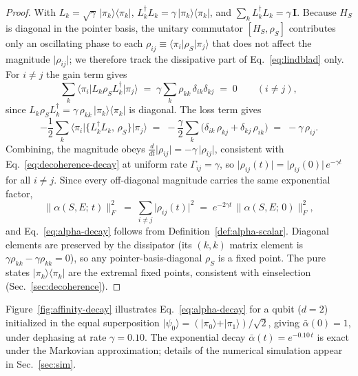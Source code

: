 \begin{proof}
With $L_k = \sqrt{\gamma}\,\vert\pi_k\rangle\langle\pi_k\vert$,
$L_k^\dagger L_k = \gamma\,\vert\pi_k\rangle\langle\pi_k\vert$, and
$\sum_k L_k^\dagger L_k = \gamma\,\mathbf{I}$.
Because $H_S$ is diagonal in the pointer basis, the unitary commutator
$[H_S,\rho_S]$ contributes only an oscillating phase to each
$\rho_{ij}\equiv\langle\pi_i\vert\rho_S\vert\pi_j\rangle$ that does not
affect the magnitude $\lvert\rho_{ij}\rvert$; we therefore track the
dissipative part of Eq.~\eqref{eq:lindblad} only.
For $i\neq j$ the gain term gives
\begin{equation*}
  \sum_k\langle\pi_i\vert L_k\rho_S L_k^\dagger\vert\pi_j\rangle
  \;=\;
  \gamma\sum_k \rho_{kk}\,\delta_{ik}\delta_{kj}
  \;=\; 0
  \qquad (i \neq j),
\end{equation*}
since $L_k\rho_S L_k^\dagger = \gamma\,\rho_{kk}\,\vert\pi_k\rangle\langle\pi_k\vert$
is diagonal.
The loss term gives
\begin{equation*}
  -\frac{1}{2}\sum_k\!
  \langle\pi_i\vert\{L_k^\dagger L_k,\,\rho_S\}\vert\pi_j\rangle
  \;=\;
  -\frac{\gamma}{2}\sum_k\!\bigl(\delta_{ik}\,\rho_{kj}
    + \delta_{kj}\,\rho_{ik}\bigr)
  \;=\; -\gamma\,\rho_{ij}.
\end{equation*}
Combining, the magnitude obeys
$\frac{d}{dt}\lvert\rho_{ij}\rvert = -\gamma\,\lvert\rho_{ij}\rvert$,
consistent with Eq.~\eqref{eq:decoherence-decay} at uniform rate
$\Gamma_{ij} = \gamma$, so
$\lvert\rho_{ij}(t)\rvert = \lvert\rho_{ij}(0)\rvert\,e^{-\gamma t}$ for
all $i \neq j$.
Since every off-diagonal magnitude carries the same exponential factor,
\begin{equation*}
  \bigl\lVert\alpha(S,E;\,t)\bigr\rVert_F^2
  \;=\; \sum_{i\neq j}\bigl\lvert\rho_{ij}(t)\bigr\rvert^2
  \;=\; e^{-2\gamma t}\,
        \bigl\lVert\alpha(S,E;\,0)\bigr\rVert_F^2,
\end{equation*}
and Eq.~\eqref{eq:alpha-decay} follows from
Definition~\ref{def:alpha-scalar}.
Diagonal elements are preserved by the dissipator (its $(k,k)$ matrix
element is $\gamma\rho_{kk}-\gamma\rho_{kk}=0$), so any pointer-basis-diagonal
$\rho_S$ is a fixed point.
The pure states $\vert\pi_k\rangle\langle\pi_k\vert$ are the extremal
fixed points, consistent with einselection (Sec.~\ref{sec:decoherence}).
\end{proof}

\begin{remark}
Figure~\ref{fig:affinity-decay} illustrates Eq.~\eqref{eq:alpha-decay}
for a qubit ($d = 2$) initialized in the equal superposition
$\vert\psi_0\rangle = (\vert\pi_0\rangle + \vert\pi_1\rangle)/\sqrt{2}$,
giving $\bar{\alpha}(0) = 1$, under dephasing at rate $\gamma = 0.10$.
The exponential decay $\bar{\alpha}(t) = e^{-0.10\,t}$ is exact under
the Markovian approximation; details of the numerical simulation appear
in Sec.~\ref{sec:sim}.
\end{remark}

